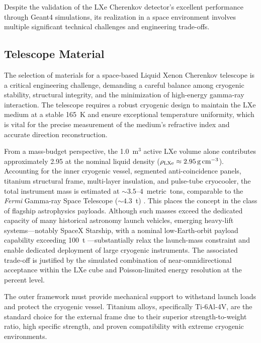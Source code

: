 \documentclass{aastex701}
\begin{document}
Despite the validation of the LXe Cherenkov detector's excellent performance through Geant4 simulations, its realization in a space environment involves multiple significant technical challenges and engineering trade-offs.

\subsection{Telescope Material}
The selection of materials for a space-based Liquid Xenon Cherenkov telescope is a critical engineering challenge, demanding a careful balance among cryogenic stability, structural integrity, and the minimization of high-energy gamma-ray interaction. The telescope requires a robust cryogenic design to maintain the LXe medium at a stable \qty{165}{\kelvin} and ensure exceptional temperature uniformity, which is vital for the precise measurement of the medium's refractive index and accurate direction reconstruction.

From a mass-budget perspective, the 1.0~m$^3$ active LXe volume alone contributes approximately \qty{2.95}{\ton} at the nominal liquid density ($\rho_{\rm LXe}\approx \qty{2.95}{\gram\per\cubic\centi\meter}$). Accounting for the inner cryogenic vessel, segmented anti-coincidence panels, titanium structural frame, multi-layer insulation, and pulse-tube cryocooler, the total instrument mass is estimated at $\sim 3.5$--$4$~metric~tons, comparable to the \textit{Fermi} Gamma-ray Space Telescope ($\sim 4.3$~t) \cite{Atwood2009}. This places the concept in the class of flagship astrophysics payloads. Although such masses exceed the dedicated capacity of many historical astronomy launch vehicles, emerging heavy-lift systems---notably SpaceX Starship, with a nominal low-Earth-orbit payload capability exceeding 100~t \cite{SpaceXStarship2020}---substantially relax the launch-mass constraint and enable dedicated deployment of large cryogenic instruments. The associated trade-off is justified by the simulated combination of near-omnidirectional acceptance within the LXe cube and Poisson-limited energy resolution at the percent level.

The outer framework must provide mechanical support to withstand launch loads and protect the cryogenic vessel. Titanium alloys, specifically Ti-6Al-4V, are the standard choice for the external frame due to their superior strength-to-weight ratio, high specific strength, and proven compatibility with extreme cryogenic environments.
\end{document}
